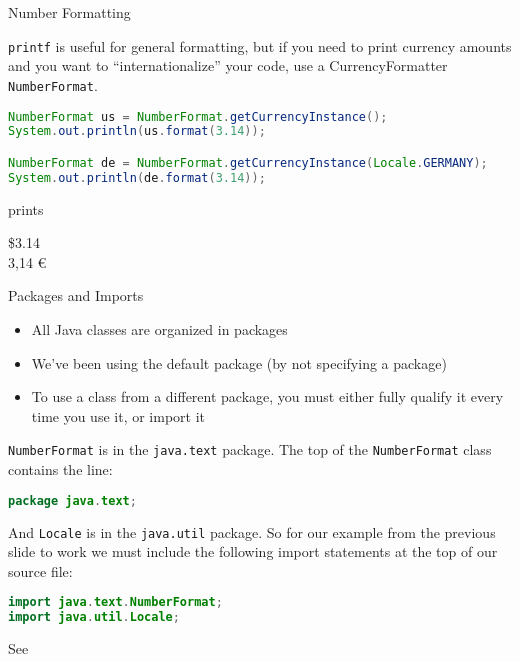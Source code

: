 \documentclass{beamer}
\begin{document}
\begin{frame}[fragile]{Number Formatting}


{\tt printf} is useful for general formatting, but if you need to print currency amounts and you want to ``internationalize'' your code, use a CurrencyFormatter {\tt NumberFormat}.

\begin{lstlisting}[language=Java]
NumberFormat us = NumberFormat.getCurrencyInstance();
System.out.println(us.format(3.14));

NumberFormat de = NumberFormat.getCurrencyInstance(Locale.GERMANY);
System.out.println(de.format(3.14));
\end{lstlisting}
prints\\
\begin{framed}
\$3.14\\
3,14 \euro
\end{framed}



\end{frame}

\begin{frame}[fragile]{Packages and Imports}
\vspace{-.1in}
\begin{itemize}
\item All Java classes are organized in packages
\item We've been using the default package (by not specifying a package)
\item To use a class from a different package, you must either fully qualify it every time you use it, or import it
\end{itemize}
{\tt NumberFormat} is in the {\tt java.text} package.  The top of the {\tt NumberFormat} class contains the line:
\begin{lstlisting}[language=Java]
package java.text;
\end{lstlisting}
 And {\tt Locale} is in the {\tt java.util} package.  So for our example from the previous slide to work we must include the following import statements at the top of our source file:
\begin{lstlisting}[language=Java]
import java.text.NumberFormat;
import java.util.Locale;
\end{lstlisting}
\vspace{-.1in}
See 
\end{frame}
\end{document}
